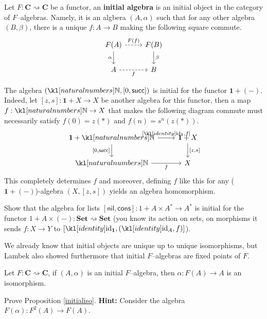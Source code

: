 \documentclass[main.tex]{subfiles}
\begin{document}
\begin{defn}\label{initalg}
	Let $F:\mathbf{C}\rightsquigarrow \mathbf{C}$ be a functor, an \textbf{initial algebra} is an initial object in the category of $F$--algebras. Namely, it is an algbera $(A, \alpha)$ such that for any other algebra $(B, \beta)$, there is a unique $f : A\rightarrow B$ making the following square commute.
	\begin{equation}\label{diag-initalg}
		\centering
		\begin{tikzcd}
			F(A) \arrow[d, "\alpha"'] \arrow[r, dashed, "F(f)"] & F(B) \arrow[d, "\beta"] \\
			A \arrow[r, dashed, "f"']                           & B                       
		\end{tikzcd}
	\end{equation}
\end{defn}
\begin{exmp}
    The algebra $(\N, [0,\succ])$ is initial for the functor $\mathbf{1} + (-)$. Indeed, let $[z,s]:\mathbf{1}+X \rightarrow X$ be another algebra for this functor, then a map $f:\N\rightarrow X$ that makes the following diagram commute must necessarily satisfy $f(0) = z(\ast)$ and $f(n) = s^n(z(\ast))$.
    \begin{equation}\label{diag-initN}
        \centering
        \begin{tikzcd}
            \mathbf{1}+\N \arrow[d, "{[0,\succ]}"'] \arrow[r, "{[\id_{\mathbf{1}}, f]}"] & \mathbf{1}+X \arrow[d, "{[z,s]}"] \\
            \N \arrow[r, "f"']                           & X                       
        \end{tikzcd}
    \end{equation}
    This completely determines $f$ and moreover, defining $f$ like this for any ($\mathbf{1} + (-)$)-algebra $(X,[z,s])$ yields an algebra homomorphism. 
\end{exmp}
\begin{exer}[2pts]\label{exer-initAlg}
    Show that the algebra for lists $[\textsf{nil}, \textsf{cons}]: 1 + A \times A^* \rightarrow A^*$ is initial for the functor $1+A \times (-): \textbf{Set}\rightsquigarrow \textbf{Set}$ (you know its action on sets, on morphisms it sends $f:X \rightarrow Y$ to $[\id_{\mathbf{1}}, (\id_A, f)]$).
\end{exer}
We already know that initial objects are unique up to unique isomorphisms, but Lambek also showed furthermore that initial $F$--algebras are fixed points of $F$.
\begin{prop}[Lambek]\label{initialiso}
	Let $F:\mathbf{C}\rightsquigarrow \mathbf{C}$, if $(A,\alpha)$ is an initial $F$--algebra, then $\alpha:F(A)\rightarrow A$ is an isomorphism.
\end{prop}
\begin{exer}[1.5pts]
    Prove Proposition \ref{initialiso}. \textbf{Hint:} Consider the algebra $F(\alpha): F^2(A) \rightarrow F(A)$.
\end{exer}
\end{document}
